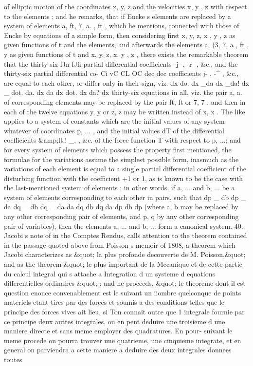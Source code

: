 \documentclass[11pt,a4paper]{book}
\begin{document}
of
elliptic
motion
of
the
coordinates
x,
y,
z
and
the
velocities
x,
y
,
z
with
respect
to
the
elements
;
and
he
remarks,
that
if Encke s
elements
are
replaced
by a
system
of
elements
a,
ft,
7,
a.
,
ft
,
which
he
mentions,
connected
with
those
of Encke
by
equations
of
a
simple
form,
then
considering
first
x,
y,
z, x
, y
,
z
as
given
functions
of
t and
the
elements, and afterwards the
elements
a,
(3,
7, a
,
ft
, y
as given functions
of
t
and
x,
y,
z,
x,
y
,
z
,
there
exists
the
remarkable
theorem
that
the
thirty-six
fJn
fJfi
partial
differential
coefficients
-j-
,
-r-
,
\&c.,
and
the
thirty-six
partial
differential
co-
Ci vC
CL OC
dec
dec
coefficients
j-
, -^
,
\&c.,
are
equal
to
each
other,
or
differ
only
in
their
sign,
viz.
dx
do.
dx _da
dx _da!
dx _
dot.
da.
dx
da
dx
dot.
dx
da?
dx
thirty-six
equations in
all,
viz.
the
pair
a,
a.
of corresponding
elements may be replaced
by
the
pair
ft,
ft
or
7, 7
:
and
then
in
each
of
the
twelve
equations
y, y
or
z,
z
may
be
written
instead
of
x, x
.
The
like
applies
to
a system
of
constants which are
the
initial
values
of any
system
whatever
of
coordinates
p, ...
,
and
the
initial
values
dT
of the
differential
coefficients
\&amp;lt;!
_,
,
\&c.
of the
force function T with
respect
to
p, ...;
and for every system of
elements
which
possess
the
property first
mentioned,
the formulae
for
the
variations assume
the
simplest
possible form, inasmuch
as
the
variations
of each
element
is equal
to a single
partial
differential
coefficient
of
the
disturbing
function
with
the
coefficient +1
or
1,
as
is known
to
be
the
case
with
the
last-mentioned
system
of
elements ;
in
other
words,
if
a, ...
and
b, ...
be
a
system
of
elements
corresponding
to each other in
pairs, such
that
dp _
db
dp _ da
dq _ db
dq _
da
da
dq
db
dq
da
dp
db
dp
(where
a,
b may be
replaced
by any
other
corresponding
pair
of
elements, and p,
q by
any
other
corresponding
pair
of
variables),
then
the
elements
a, ...
and
b, ...
form
a
canonical
system.
40.
Jacobi s
note
of
in
the
Comptes Rendus,
calls
attention
to
the theorem
contained
in
the
passage
quoted
above
from
Poisson s
memoir
of
1808,
a
theorem
which
Jacobi
characterizes
as
\&quot; la
plus
profonde
decouverte de M.
Poisson,\&quot; and
as the
theorem
\&quot; le
plus
important
de
la
Mecanique
et
de
cette
partie
du
calcul
integral
qui
s attache a
Integration
d un
systeme
d equations
differentielles
ordinaires
\&quot;
;
and he
proceeds,
\&quot; le
theoreme
dont
il
est
question
enonce
convenablement
est
le
suivant
un
iiombre
quelconque
de
points
materiels
etant
tires
par
des
forces
et
soumis
a
des
conditions
telles
que
le
principe
des
forces
vives
ait
lieu,
si
Ton
connait
outre
que
1 integrale
fournie
par
ce
principe
deux
autres
integrales,
on
en
pent
deduire
une
troisieme
d une
maniere
directe
et
sans meme
employer
des
quadratures.
En
pour-
suivant
le meme
procede on
pourra
trouver
une
quatrieme, une
cinquieme
integrate,
et
en
general
on
parviendra
a
cette
maniere a deduire des deux
integrales donnees
toutes
\end{document}
